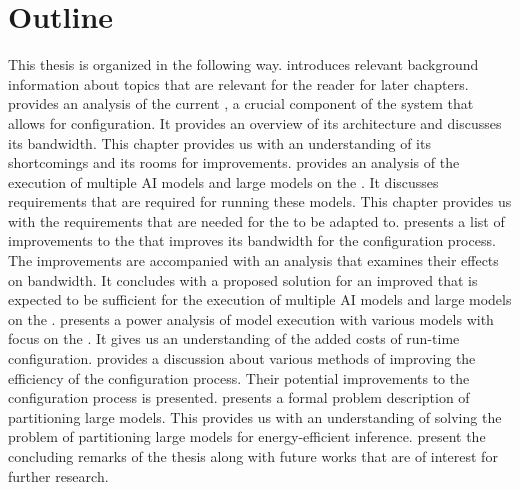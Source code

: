 \section{Outline}
This thesis is organized in the following way.
 introduces relevant background information about topics that are relevant for the reader for later chapters.
 provides an analysis of the current \confignoc{}, a crucial component of the system that allows for configuration.
It provides an overview of its architecture and discusses its bandwidth.
This chapter provides us with an understanding of its shortcomings and its rooms for improvements.
 provides an analysis of the execution of multiple AI models and large models on the \graicore{}.
It discusses requirements that are required for running these models.
This chapter provides us with the requirements that are needed for the \confignoc{} to be adapted to.
 presents a list of improvements to the \confignoc{} that improves its bandwidth for the configuration process.
The improvements are accompanied with an analysis that examines their effects on bandwidth.
It concludes with a proposed solution for an improved \confignoc{} that is expected to be sufficient for the execution of multiple AI models and large models on the \graicore{}.
 presents a power analysis of model execution with various models with focus on the \confignoc{}.
It gives us an understanding of the added costs of run-time configuration.
 provides a discussion about various methods of improving the efficiency of the configuration process.
Their potential improvements to the configuration process is presented.
 presents a formal problem description of partitioning large models.
This provides us with an understanding of solving the problem of partitioning large models for energy-efficient inference.
 present the concluding remarks of the thesis along with future works that are of interest for further research.

